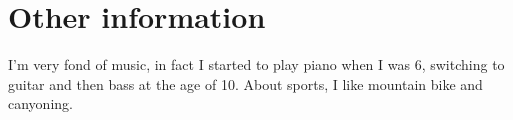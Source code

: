 \documentclass[letterpaper]{twentysecondcv} %
\begin{document}
\section{Other information}

I'm very fond of music, in fact I started to play piano when I was 6,  switching to guitar and then bass at the age of 10. About sports, I like mountain bike and canyoning.\newline
 
 
 
 
 
 
 
\end{document}
